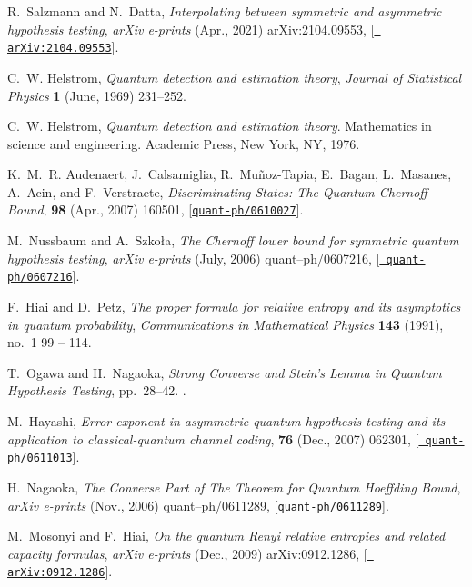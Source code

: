 \documentclass[a4paper,11pt]{article}
\newcommand{\pra}{\text{Physical Review A}}
\newcommand{\prl}{\text{Physical Review Letters}}
\begin{document}
\begin{thebibliography}{100}
R.~{Salzmann} and N.~{Datta}, {\it {Interpolating between symmetric and
  asymmetric hypothesis testing}},  {\em arXiv e-prints} (Apr., 2021)
  arXiv:2104.09553, [\href{http://arxiv.org/abs/2104.09553}{{\tt
  arXiv:2104.09553}}].

C.~W. {Helstrom}, {\it {Quantum detection and estimation theory}},  {\em
  Journal of Statistical Physics} {\bf 1} (June, 1969) 231--252.

C.~W. Helstrom, {\em {Quantum detection and estimation theory}}.
\newblock Mathematics in science and engineering. Academic Press, New York, NY,
  1976.

K.~M.~R. {Audenaert}, J.~{Calsamiglia}, R.~{Mu{\~n}oz-Tapia}, E.~{Bagan},
  L.~{Masanes}, A.~{Acin}, and F.~{Verstraete}, {\it {Discriminating States:
  The Quantum Chernoff Bound}},  {\em \prl} {\bf 98} (Apr., 2007) 160501,
  [\href{http://arxiv.org/abs/quant-ph/0610027}{{\tt quant-ph/0610027}}].

M.~{Nussbaum} and A.~{Szko{\l}a}, {\it {The Chernoff lower bound for symmetric
  quantum hypothesis testing}},  {\em arXiv e-prints} (July, 2006)
  quant--ph/0607216, [\href{http://arxiv.org/abs/quant-ph/0607216}{{\tt
  quant-ph/0607216}}].

F.~Hiai and D.~Petz, {\it {The proper formula for relative entropy and its
  asymptotics in quantum probability}},  {\em Communications in Mathematical
  Physics} {\bf 143} (1991), no.~1 99 -- 114.

T.~{Ogawa} and H.~{Nagaoka}, {\em {Strong Converse and Stein's Lemma in Quantum
  Hypothesis Testing}}, pp.~28--42.
.

M.~{Hayashi}, {\it {Error exponent in asymmetric quantum hypothesis testing and
  its application to classical-quantum channel coding}},  {\em \pra} {\bf 76}
  (Dec., 2007) 062301, [\href{http://arxiv.org/abs/quant-ph/0611013}{{\tt
  quant-ph/0611013}}].

H.~{Nagaoka}, {\it {The Converse Part of The Theorem for Quantum Hoeffding
  Bound}},  {\em arXiv e-prints} (Nov., 2006) quant--ph/0611289,
  [\href{http://arxiv.org/abs/quant-ph/0611289}{{\tt quant-ph/0611289}}].

M.~{Mosonyi} and F.~{Hiai}, {\it {On the quantum Renyi relative entropies and
  related capacity formulas}},  {\em arXiv e-prints} (Dec., 2009)
  arXiv:0912.1286, [\href{http://arxiv.org/abs/0912.1286}{{\tt
  arXiv:0912.1286}}].


\end{thebibliography}
\end{document}
